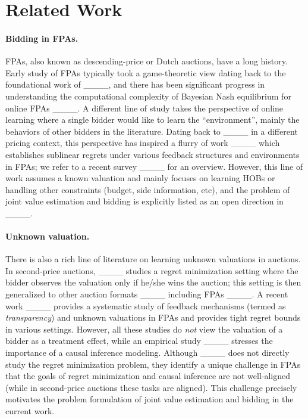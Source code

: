 \section{Related Work}
\paragraph{Bidding in FPAs.} FPAs, also known as descending-price or Dutch auctions, have a long history. Early study of FPAs typically took a game-theoretic view dating back to the foundational work of ____, and there has been significant progress in understanding the computational complexity of Bayesian Nash equilibrium for online FPAs ____. A different line of study takes the perspective of online learning where a single bidder would like to learn the ``environment'', mainly the behaviors of other bidders in the literature. Dating back to ____ in a different pricing context, this perspective has inspired a flurry of work ____ which establishes sublinear regrets under various feedback structures and environments in FPAs; we refer to a recent survey ____ for an overview. However, this line of work assumes a known valuation and mainly focuses on learning HOBs or handling other constraints (budget, side information, etc), and the problem of joint value estimation and bidding is explicitly listed as an open direction in ____.

\paragraph{Unknown valuation.} There is also a rich line of literature on learning unknown valuations in auctions. In second-price auctions, ____ studies a regret minimization setting where the bidder observes the valuation only if he/she wins the auction; this setting is then generalized to other auction formats ____ including FPAs ____. A recent work ____ provides a systematic study of feedback mechanisms (termed as \emph{transparency}) and unknown valuations in FPAs and provides tight regret bounds in various settings. However, all these studies do \emph{not} view the valuation of a bidder as a treatment effect, while an empirical study ____ stresses the importance of a causal inference modeling. Although ____ does not directly study the regret minimization problem, they identify a unique challenge in FPAs that the goals of regret minimization and causal inference are not well-aligned (while in second-price auctions these tasks are aligned). This challenge precisely motivates the problem formulation of joint value estimation and bidding in the current work. 

